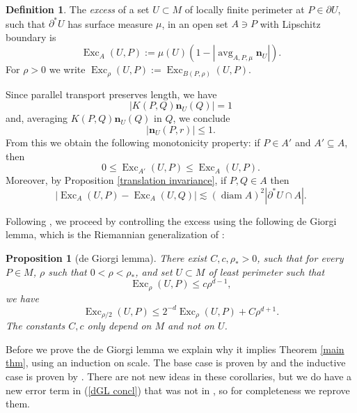 \documentclass[reqno,11pt]{amsart}
\DeclareMathOperator{\avg}{avg}
\DeclareMathOperator{\diam}{diam}
\DeclareMathOperator{\Exc}{Exc}
\newcommand{\normal}{\mathbf n}
\newcommand{\dfn}[1]{\emph{#1}\index{#1}}
\newtheorem{proposition}[theorem]{Proposition}
\theoremstyle{definition}
\newtheorem{definition}[theorem]{Definition}
\numberwithin{equation}{section}
\begin{document}
\begin{definition}
The \dfn{excess} of a set $U \subset M$ of locally finite perimeter at $P \in \partial U$, such that $\partial^* U$ has surface measure $\mu$, in an open set $A \ni P$ with Lipschitz boundary is
$$\Exc_A(U, P) := \mu(U)\left(1 - \left|\avg_{A, P, \mu} \normal_U\right|\right).$$
For $\rho > 0$ we write $\Exc_\rho(U, P) := \Exc_{B(P, \rho)}(U, P)$.
\end{definition}

Since parallel transport preserves length, we have
$$|K(P, Q) \normal_U(Q)| = 1$$
and, averaging $K(P, Q) \normal_U(Q)$ in $Q$, we conclude
\begin{equation}\label{normal isnt too big}
|\normal_U(P, r)| \leq 1.
\end{equation}
From this we obtain the following monotonicity property: if $P \in A'$ and $A' \subseteq A$, then
\begin{equation}\label{approximate monotone}
0 \leq \Exc_{A'}(U, P) \leq \Exc_A(U, P).
\end{equation}
Moreover, by Proposition \ref{translation invariance}, if $P, Q \in A$ then 
\begin{equation}\label{translation invariant excess}
|\Exc_A(U, P) - \Exc_A(U, Q)| \lesssim (\diam A)^2 |\partial^* U \cap A|.
\end{equation}

Following \cite{Miranda66,Giusti77,deGiorgi61}, we proceed by controlling the excess using the following de Giorgi lemma, which is the Riemannian generalization of \cite[Theorem 8.1]{Giusti77}:

\begin{proposition}[de Giorgi lemma]\label{de Giorgi}
There exist $C, c, \rho_* > 0$, such that for every $P \in M$, $\rho$ such that $0 < \rho < \rho_*$, and set $U \subset M$ of least perimeter such that
\begin{equation}\label{base case}
\Exc_\rho(U, P) \leq c\rho^{d - 1},
\end{equation}
we have
\begin{equation}\label{dGL concl}
\Exc_{\rho/2}(U, P) \leq 2^{-d} \Exc_\rho(U, P) + C\rho^{d + 1}.
\end{equation}
The constants $C, c$ only depend on $M$ and not on $U$.
\end{proposition}

Before we prove the de Giorgi lemma we explain why it implies Theorem \ref{main thm}, using an induction on scale.
The base case is proven by \cite[pg109]{Giusti77} and the inductive case is proven by \cite[Corollary 8.3]{Giusti77}.
There are not new ideas in these corollaries, but we do have a new error term in (\ref{dGL concl}) that was not in \cite[Theorem 8.1]{Giusti77}, so for completeness we reprove them.
\end{document}
